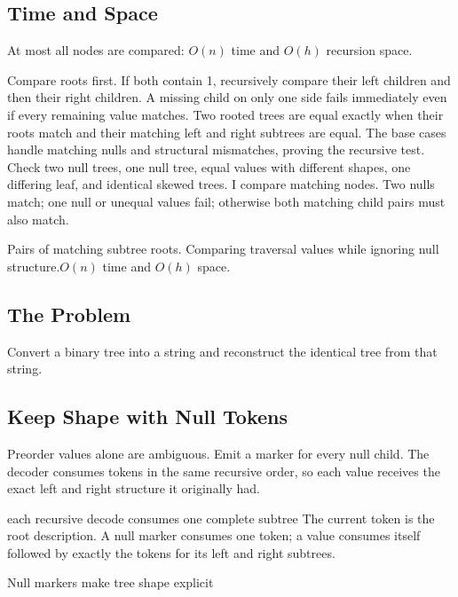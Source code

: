 \subsection{Time and Space}
At most all nodes are compared: \(O(n)\) time and \(O(h)\) recursion space.

\lessonexpansion
  {Compare roots first. If both contain 1, recursively compare their left
   children and then their right children. A missing child on only one side
   fails immediately even if every remaining value matches.}
  {Two rooted trees are equal exactly when their roots match and their
   matching left and right subtrees are equal. The base cases handle
   matching nulls and structural mismatches, proving the recursive test.}
  {Check two null trees, one null tree, equal values with different shapes,
   one differing leaf, and identical skewed trees.}
  {I compare matching nodes. Two nulls match; one null or unequal values
   fail; otherwise both matching child pairs must also match.}

  {Pairs of matching subtree roots.}
  {Comparing traversal values while ignoring null structure.}{$O(n)$ time and $O(h)$ space.}



\subsection{The Problem}
Convert a binary tree into a string and reconstruct the identical tree from
that string.

\subsection{Keep Shape with Null Tokens}
Preorder values alone are ambiguous. Emit a marker for every null child. The
decoder consumes tokens in the same recursive order, so each value receives
the exact left and right structure it originally had.

\begin{invariantbox}{each recursive decode consumes one complete subtree}
The current token is the root description. A null marker consumes one token;
a value consumes itself followed by exactly the tokens for its left and right
subtrees.
\end{invariantbox}

\begin{visualbox}{Null markers make tree shape explicit}
\centering
{}
\end{visualbox}

